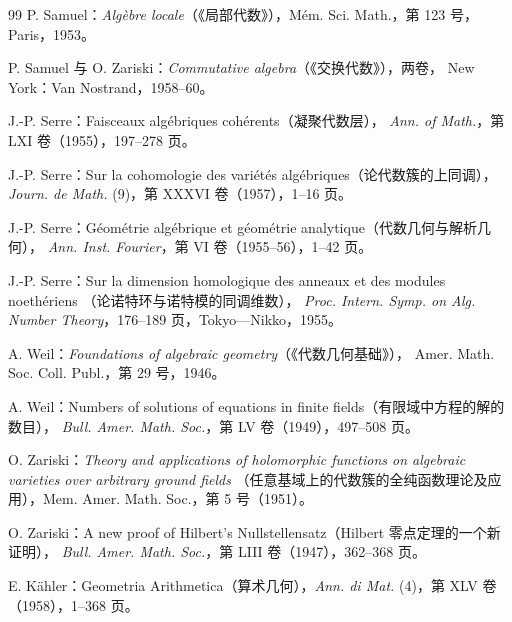 \begin{thebibliography}{99}
P. Samuel：\textit{Algèbre locale}（《局部代数》），Mém. Sci. Math.，第 123 号，Paris，1953。

P. Samuel 与 O. Zariski：\textit{Commutative algebra}（《交换代数》），两卷，
New York：Van Nostrand，1958–60。

J.-P. Serre：Faisceaux algébriques cohérents（凝聚代数层），
\textit{Ann. of Math.}，第 LXI 卷（1955），197–278 页。

J.-P. Serre：Sur la cohomologie des variétés algébriques（论代数簇的上同调），
\textit{Journ. de Math.} (9)，第 XXXVI 卷（1957），1–16 页。

J.-P. Serre：Géométrie algébrique et géométrie analytique（代数几何与解析几何），
\textit{Ann. Inst. Fourier}，第 VI 卷（1955–56），1–42 页。

J.-P. Serre：Sur la dimension homologique des anneaux et des modules noethériens
（论诺特环与诺特模的同调维数），
\textit{Proc. Intern. Symp. on Alg. Number Theory}，176–189 页，Tokyo—Nikko，1955。

A. Weil：\textit{Foundations of algebraic geometry}（《代数几何基础》），
Amer. Math. Soc. Coll. Publ.，第 29 号，1946。

A. Weil：Numbers of solutions of equations in finite fields（有限域中方程的解的数目），
\textit{Bull. Amer. Math. Soc.}，第 LV 卷（1949），497–508 页。

O. Zariski：\textit{Theory and applications of holomorphic functions on algebraic varieties over arbitrary ground fields}
（任意基域上的代数簇的全纯函数理论及应用），Mem. Amer. Math. Soc.，第 5 号（1951）。

O. Zariski：A new proof of Hilbert's Nullstellensatz（Hilbert 零点定理的一个新证明），
\textit{Bull. Amer. Math. Soc.}，第 LIII 卷（1947），362–368 页。

E. Kähler：Geometria Arithmetica（算术几何），\textit{Ann. di Mat.} (4)，第 XLV 卷（1958），1–368 页。
\end{thebibliography}





